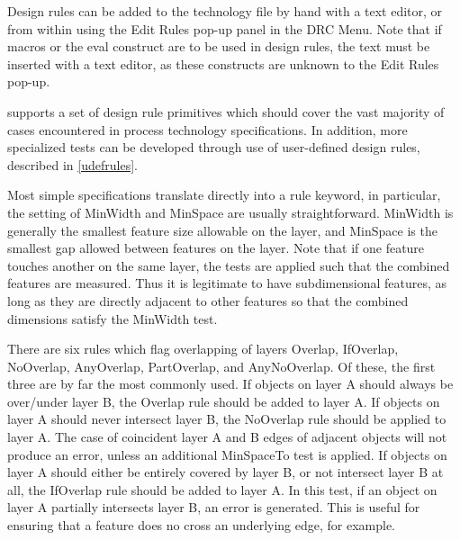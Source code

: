 Design rules can be added to the technology file by hand with a text
editor, or from within {\Xic} using the {\cb Edit Rules} pop-up panel in the
{\cb DRC Menu}.  Note that if macros or the {\et eval} construct are to be
used in design rules, the text must be inserted with a text editor, as
these constructs are unknown to the {\cb Edit Rules} pop-up.

{\Xic} supports a set of design rule primitives which should cover the vast
majority of cases encountered in process technology specifications. 
In addition, more specialized tests can be developed through use of
user-defined design rules, described in \ref{udefrules}.

Most simple specifications translate directly into a rule keyword, in
particular, the setting of {\et MinWidth} and {\et MinSpace} are
usually straightforward.  {\et MinWidth} is generally the smallest
feature size allowable on the layer, and {\et MinSpace} is the
smallest gap allowed between features on the layer.  Note that if one
feature touches another on the same layer, the tests are applied such
that the combined features are measured.  Thus it is legitimate to
have subdimensional features, as long as they are directly adjacent to
other features so that the combined dimensions satisfy the {\et
MinWidth} test.

There are six rules which flag overlapping of layers {\et Overlap},
{\et IfOverlap}, {\et NoOverlap}, {\et AnyOverlap}, {\et PartOverlap},
and {\et AnyNoOverlap}.  Of these, the first three are by far the most
commonly used.  If objects on layer A should always be over/under
layer B, the {\et Overlap} rule should be added to layer A.  If
objects on layer A should never intersect layer B, the {\et NoOverlap}
rule should be applied to layer A.  The case of coincident layer A and
B edges of adjacent objects will not produce an error, unless an
additional {\et MinSpaceTo} test is applied.  If objects on layer A
should either be entirely covered by layer B, or not intersect layer B
at all, the {\et IfOverlap} rule should be added to layer A.  In this
test, if an object on layer A partially intersects layer B, an error
is generated.  This is useful for ensuring that a feature does no
cross an underlying edge, for example.

